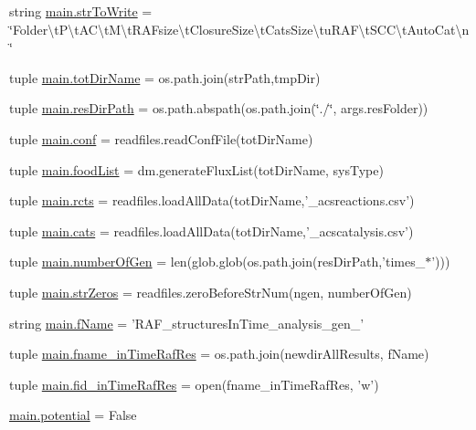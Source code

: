 \begin{DoxyCompactItemize}
\item 
string \hyperlink{a00122_ab9980383a541b03ce91d6b812a4bf79a}{main.\-str\-To\-Write} = \char`\"{}Folder\textbackslash{}t\-P\textbackslash{}t\-A\-C\textbackslash{}t\-M\textbackslash{}t\-R\-A\-Fsize\textbackslash{}t\-Closure\-Size\textbackslash{}t\-Cats\-Size\textbackslash{}tu\-R\-A\-F\textbackslash{}t\-S\-C\-C\textbackslash{}t\-Auto\-Cat\textbackslash{}n\char`\"{}
\item 
tuple \hyperlink{a00122_a82f73a786e4c93e909fd689ee0d0812e}{main.\-tot\-Dir\-Name} = os.\-path.\-join(str\-Path,tmp\-Dir)
\item 
tuple \hyperlink{a00122_a93d7d68ada532b3cedaab103283ab91a}{main.\-res\-Dir\-Path} = os.\-path.\-abspath(os.\-path.\-join(\char`\"{}./\char`\"{}, args.\-res\-Folder))
\item 
tuple \hyperlink{a00122_adc567db25548116293968a9102beab98}{main.\-conf} = readfiles.\-read\-Conf\-File(tot\-Dir\-Name)
\item 
tuple \hyperlink{a00122_a07ce1f0750b6dc5baff89792fc194152}{main.\-food\-List} = dm.\-generate\-Flux\-List(tot\-Dir\-Name, sys\-Type)
\item 
tuple \hyperlink{a00122_ac2fe1ed3228b8e616f25ccfbe4cc7dc4}{main.\-rcts} = readfiles.\-load\-All\-Data(tot\-Dir\-Name,'\-\_\-acsreactions.\-csv')
\item 
tuple \hyperlink{a00122_adc0282a6415a88834556e66807bcc800}{main.\-cats} = readfiles.\-load\-All\-Data(tot\-Dir\-Name,'\-\_\-acscatalysis.\-csv')
\item 
tuple \hyperlink{a00122_aabf82b9e9c2293000a67162becdd440d}{main.\-number\-Of\-Gen} = len(glob.\-glob(os.\-path.\-join(res\-Dir\-Path,'times\-\_\-$\ast$')))
\item 
tuple \hyperlink{a00122_a02d59015bebcf0ad1bc1162efca757c3}{main.\-str\-Zeros} = readfiles.\-zero\-Before\-Str\-Num(ngen, number\-Of\-Gen)
\item 
string \hyperlink{a00122_a9fff4b23f9489649601960dabc4a6cdd}{main.\-f\-Name} = 'R\-A\-F\-\_\-structures\-In\-Time\-\_\-analysis\-\_\-gen\-\_\-'
\item 
tuple \hyperlink{a00122_a64d742d069748ddd43a9378ef918d0b1}{main.\-fname\-\_\-in\-Time\-Raf\-Res} = os.\-path.\-join(newdir\-All\-Results, f\-Name)
\item 
tuple \hyperlink{a00122_ab82095abcedb97b7abf8e003f4724d0c}{main.\-fid\-\_\-in\-Time\-Raf\-Res} = open(fname\-\_\-in\-Time\-Raf\-Res, 'w')
\item 
\hyperlink{a00122_abe4c267a63409b1b7cd9c6aaf0779b4a}{main.\-potential} = False

\end{DoxyCompactItemize}

